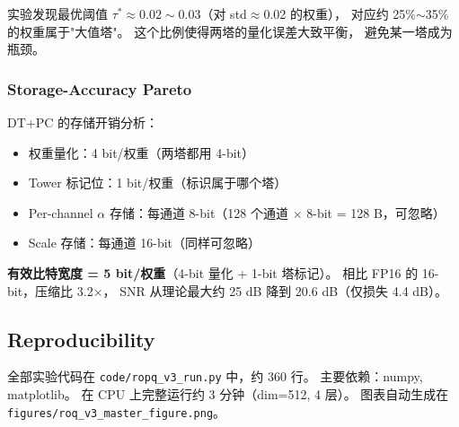 实验发现最优阈值 $\tau^* \approx 0.02 \sim 0.03$（对 std$\approx$0.02 的权重），
对应约 25\%$\sim$35\% 的权重属于"大值塔"。
这个比例使得两塔的量化误差大致平衡，
避免某一塔成为瓶颈。

\subsubsection{Storage-Accuracy Pareto}

DT+PC 的存储开销分析：
\begin{itemize}
\item 权重量化：4 bit/权重（两塔都用 4-bit）
\item Tower 标记位：1 bit/权重（标识属于哪个塔）
\item Per-channel $\alpha$ 存储：每通道 8-bit（128 个通道 $\times$ 8-bit = 128 B，可忽略）
\item Scale 存储：每通道 16-bit（同样可忽略）
\end{itemize}

\textbf{有效比特宽度 = 5 bit/权重}（4-bit 量化 + 1-bit 塔标记）。
相比 FP16 的 16-bit，压缩比 3.2$\times$，
SNR 从理论最大约 25 dB 降到 20.6 dB（仅损失 4.4 dB）。

\subsection{Reproducibility}

全部实验代码在 \texttt{code/ropq\_v3\_run.py} 中，约 360 行。
主要依赖：numpy, matplotlib。
在 CPU 上完整运行约 3 分钟（dim=512, 4 层）。
图表自动生成在 \texttt{figures/roq\_v3\_master\_figure.png}。
